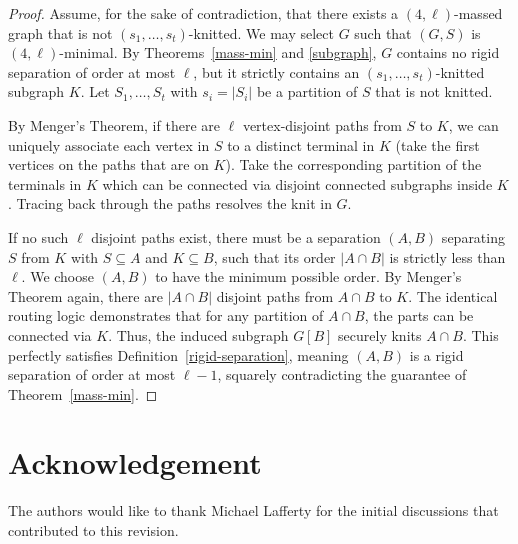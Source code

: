 \documentclass[11pt]{amsart}
\begin{document}
\begin{proof}
Assume, for the sake of contradiction, that there exists a $(4, \ell)$-massed graph that is not $(s_1, \ldots, s_t)$-knitted. We may select $G$ such that $(G,S)$ is $(4,\ell)$-minimal. By Theorems~\ref{mass-min} and \ref{subgraph}, $G$ contains no rigid separation of order at most $\ell$, but it strictly contains an $(s_1, \ldots, s_t)$-knitted subgraph $K$.  Let $S_1, \ldots, S_t$ with $s_i=|S_i|$ be a partition of $S$ that is not knitted. 

By Menger's Theorem, if there are $\ell$ vertex-disjoint paths from $S$ to $K$, we can uniquely associate each vertex in $S$ to a distinct terminal in $K$ (take the first vertices on the paths that are on $K$). Take the corresponding partition of the terminals in $K$ which can be connected via disjoint connected subgraphs inside $K$. Tracing back through the paths resolves the knit in $G$.

If no such $\ell$ disjoint paths exist, there must be a separation $(A,B)$ separating $S$ from $K$ with $S\subseteq A$ and $K\subseteq B$, such that its order $|A\cap B|$ is strictly less than $\ell$. We choose $(A,B)$ to have the minimum possible order. By Menger's Theorem again, there are $|A\cap B|$ disjoint paths from $A\cap B$ to $K$. The identical routing logic demonstrates that for any partition of $A\cap B$, the parts can be connected via $K$. Thus, the induced subgraph $G[B]$ securely knits $A\cap B$. This perfectly satisfies Definition~\ref{rigid-separation}, meaning $(A,B)$ is a rigid separation of order at most $\ell-1$, squarely contradicting the guarantee of Theorem~\ref{mass-min}.
\end{proof}

\section*{Acknowledgement} 
The authors would like to thank Michael Lafferty for the initial discussions that contributed to this revision.
\end{document}
